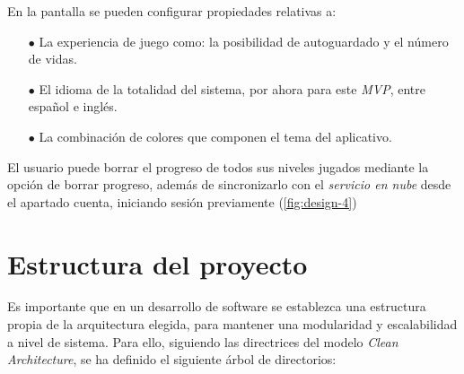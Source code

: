 En la pantalla se pueden configurar propiedades relativas a: 

\begin{itemize}
  \item[$\bullet$] La experiencia de juego como: la posibilidad de autoguardado y
  el número de vidas.
  \item[$\bullet$] El idioma de la totalidad del sistema, por ahora para este \textit{MVP}, entre español e inglés.
  \item[$\bullet$] La combinación de colores que componen el tema del aplicativo.
\end{itemize}

El usuario puede borrar el progreso de todos sus niveles jugados mediante la opción de borrar
progreso, además de sincronizarlo con el \textit{servicio en nube} desde el apartado cuenta, 
iniciando sesión previamente (\autoref{fig:design-4})

\section{Estructura del proyecto}
Es importante que en un desarrollo de software se establezca una estructura propia de la arquitectura elegida,
para mantener una modularidad y escalabilidad a nivel de sistema.
Para ello, siguiendo las directrices del modelo \textit{Clean Architecture}, se ha definido el siguiente
árbol de directorios:


